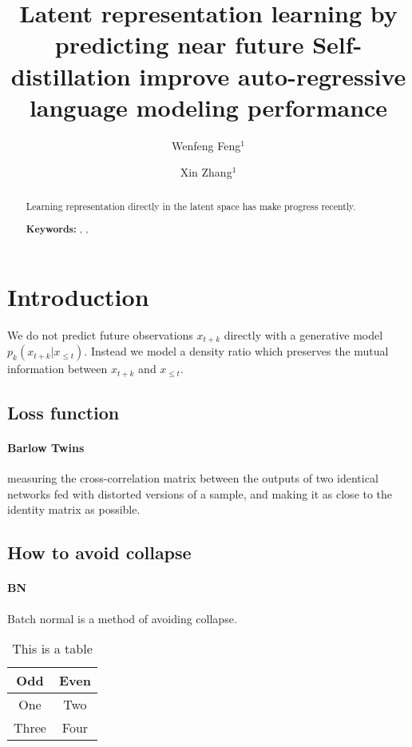 \documentclass[a4paper]{article}
\title{
	Latent representation learning by predicting near future
	Self-distillation improve auto-regressive language modeling performance
	}
\author{Wenfeng Feng$^1$ \and Xin Zhang$^1$}
\date{
}
\theoremstyle{plain}
\theoremstyle{definition}
\begin{document}
	\maketitle
	
	\begin{abstract}
		Learning representation directly in the latent space has make progress recently.
		
		\noindent\textbf{Keywords:} , , 
	\end{abstract}

	\tableofcontents
	
	\section{Introduction}
	\label{sec:intro}
	
	We do not predict future observations $x_{t+k}$ directly with a generative model $p_k(x_{t+k}|x_{\le t})$.
	Instead we model a density ratio which preserves the mutual information between $x_{t+k}$ and $x_{\le t}$.
	\cite{van2018representation}
	
	\subsection{Loss function}
	\label{subsec:loss}

	\paragraph*{Barlow Twins} \cite{zbontar2021barlow}
	measuring the cross-correlation matrix between the outputs of two identical networks fed with distorted versions of a sample,
	and making it as close to the identity matrix as possible.

	
	\subsection{How to avoid collapse}
	\label{subsec:avoid-collapse}

	\paragraph*{BN}
	Batch normal is a method of avoiding collapse.

	\begin{table}[ht]
		\centering
		\begin{tabular}{|c|c|}
			\hline
			\textbf{Odd} & \textbf{Even} \\
			\hline
			One & Two \\
			\hline
			Three & Four \\
			\hline
		\end{tabular}
		\caption{This is a table}
		\label{tbl:1}
	\end{table}
\end{document}
